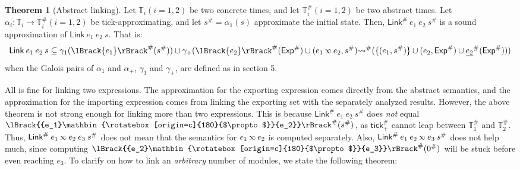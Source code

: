 \documentclass[acmsmall,review]{acmart}\settopmatter{printfolios=true,printccs=false,printacmref=false}
\theoremstyle{definition}
\newtheorem{thm}{Theorem}[section]
\newcommand*{\A}[1]{{#1}^{\#}}
\newcommand*{\Time}{\mathbb{T}}
\newcommand*{\ATime}{\A{\Time}}
\newcommand*{\semarrow}{\rightsquigarrow}
\newcommand*{\semlink}{\mathbin{\rotatebox[origin=c]{180}{$\propto$}}}
\newcommand*{\link}[2]{{#1}\semlink{#2}}
\newcommand*{\Exp}{\mathsf{Exp}}
\newcommand*{\Link}{\mathsf{Link}}
\newcommand*{\sembracket}[1]{\lBrack{#1}\rBrack}
\newcommand*{\tick}{\mathsf{tick}}
\begin{document}
\begin{thm}[Abstract linking]
  Let $\Time_i(i=1,2)$ be two concrete times, and let $\ATime_i(i=1,2)$ be two abstract times.
  Let $\alpha_i:\Time_i\rightarrow\ATime_i(i=1,2)$ be tick-approximating, and let $\A{s}=\alpha_1(s)$ approximate the initial state.
  Then, $\A\Link\:e_1\:e_2\:\A{s}$ is a sound approximation of $\Link\:e_1\:e_2\:s$.
  That is:
  \[\Link\:e_1\:e_2\:s\subseteq\gamma_1(\A{\sembracket{e_1}}(\A{s}))\cup\gamma_+(\A{\sembracket{e_2}}(\A\Exp)\cup(\link{e_1}{e_2},\A{s})\A\semarrow(\{(e_1,\A{s})\}\cup(e_2,\A\Exp)\cup\A{\underline{e_2}}(\A\Exp)))\]
  when the Galois pairs of $\alpha_1$ and $\alpha_+$, $\gamma_1$ and $\gamma_+$, are defined as in section 5.
\end{thm}

All is fine for linking two expressions.
The approximation for the exporting expression comes directly from the abstract semantics, and the approximation for the importing expression comes from linking the exporting set with the separately analyzed results.
However, the above theorem is not strong enough for linking more than two expressions.
This is because $\A\Link\:e_1\:e_2\:\A{s}$ does \emph{not} equal $\A{\sembracket{\link{e_1}{e_2}}}(\A{s})$, as $\A\tick_+$ cannot leap between $\ATime_1$ and $\ATime_2$.
Thus, $\A\Link\:\link{e_1}{e_2}\:e_3\:\A{s}$ does not mean that the semantics for $\link{e_1}{e_2}$ is computed separately.
Also, $\A\Link\:e_1\:\link{e_2}{e_3}\:\A{s}$ does not help much, since computing $\A{\sembracket{\link{e_2}{e_3}}}(\A{0})$ will be stuck before even reaching $e_3$.
To clarify on how to link an \emph{arbitrary} number of modules, we state the following theorem:
\end{document}
